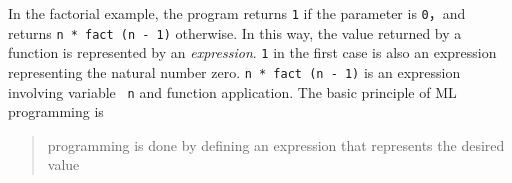 \documentclass{jbook}
\newcommand{\txt}[2]{#2}
\begin{document}
\txt
{
	前節の階乗の計算では，引数が{\tt 0}の場合は{\tt 1}を返し，それ以
外の一般の{\tt n}の場合は，{\tt n * fact (n - 1)}を返すようにプログラム
されていました．
	このように，関数が返すべき値は，値を表す式で表現されます．
	最初の場合の{\tt 1}も，値そのものではなく，ゼロという値を表す式
とみなします．
	{\tt n * fact (n - 1)}は，変数{\tt n}と関数を含む式です．
	一般にML言語の大原則は，
\begin{quote}
MLのプログラミングは，必要な値をもつ式を定義することを通じて行う
\end{quote}
というものです．
}
{
	In the factorial example, the program returns {\tt 1} 
if the parameter is {\tt 0}，and returns {\tt n * fact (n - 1)}
otherwise.
	In this way, the value returned by a function is represented by
an {\em expression}.
	{\tt 1} in the first case is also an expression representing
the natural number zero.
	{\tt n * fact (n - 1)} is an expression involving variable {\tt
n} and function application.
	The basic principle of ML programming is 
\begin{quote}
programming is done by defining an expression that represents the desired value
\end{quote}
}
\end{document}
